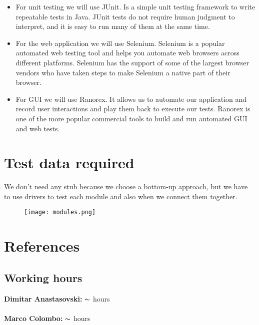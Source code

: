 \documentclass[12pt, oneside]{book}   	%
\begin{document}
\begin{itemize}
\item For unit testing we will use JUnit. Is a simple unit testing framework to write repeatable tests in Java. JUnit tests do not require human judgment to interpret, and it is easy to run many of them at the same time.
\item For the web application we will use Selenium. Selenium is a popular automated web testing tool and helps you automate web browsers across different platforms. Selenium has the support of some of the largest browser vendors who have taken steps to make Selenium a native part of their browser.
\item For GUI we will use Ranorex. It allows us to automate our application and  record user interactions and play them back to execute our tests. Ranorex is one of the more popular commercial tools to build and run automated GUI and web tests.
\end{itemize}
\chapter{Test data required}
We don't need any stub because we choose a bottom-up approach, but we have to use drivers to test each module and also when we connect them together.
\begin{figure}[h]
\centering
\texttt{[image: modules.png]}
\end{figure}
\chapter{References}
\section{Working hours}
\textbf{Dimitar Anastasovski:} $\thicksim$ hours
\\
\\
\textbf{Marco Colombo:} $\thicksim$ hours
\end{document}

